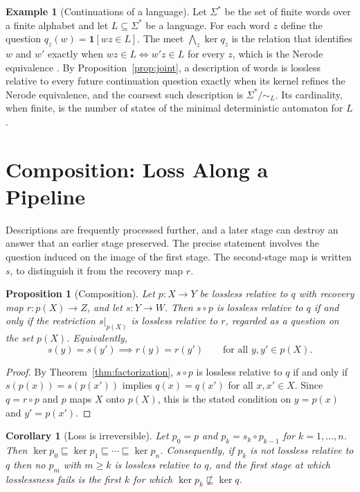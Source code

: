 \documentclass[11pt]{article}
\newtheorem{proposition}[theorem]{Proposition}
\newtheorem{corollary}[theorem]{Corollary}
\theoremstyle{definition}
\newtheorem{example}[theorem]{Example}
\theoremstyle{remark}
\newcommand{\refines}{\sqsubseteq}
\newcommand{\bigmeet}{\bigwedge}
\begin{document}
\begin{example}[Continuations of a language]\label{ex:nerode}
Let $\Sigma^*$ be the set of finite words over a finite alphabet and let $L\subseteq\Sigma^*$ be a language. For each word $z$ define the question $q_z(w)=\mathbf 1[wz\in L]$. The meet $\bigmeet_{z}\ker q_z$ is the relation that identifies $w$ and $w'$ exactly when $wz\in L\iff w'z\in L$ for every $z$, which is the Nerode equivalence \cite{nerode}. By Proposition~\ref{prop:joint}, a description of words is lossless relative to every future continuation question exactly when its kernel refines the Nerode equivalence, and the coarsest such description is $\Sigma^*/\!\sim_L$. Its cardinality, when finite, is the number of states of the minimal deterministic automaton for $L$.
\end{example}

\section{Composition: Loss Along a Pipeline}\label{sec:composition}

Descriptions are frequently processed further, and a later stage can destroy an answer that an earlier stage preserved. The precise statement involves the question induced on the image of the first stage. The second-stage map is written $s$, to distinguish it from the recovery map $r$.

\begin{proposition}[Composition]\label{prop:composition}
Let $p:X\to Y$ be lossless relative to $q$ with recovery map $r:p(X)\to Z$, and let $s:Y\to W$. Then $s\circ p$ is lossless relative to $q$ if and only if the restriction $s|_{p(X)}$ is lossless relative to $r$, regarded as a question on the set $p(X)$. Equivalently,
\[
s(y)=s(y')\implies r(y)=r(y')\qquad\text{for all }y,y'\in p(X).
\]
\end{proposition}

\begin{proof}
By Theorem~\ref{thm:factorization}, $s\circ p$ is lossless relative to $q$ if and only if $s(p(x))=s(p(x'))$ implies $q(x)=q(x')$ for all $x,x'\in X$. Since $q=r\circ p$ and $p$ maps $X$ onto $p(X)$, this is the stated condition on $y=p(x)$ and $y'=p(x')$.
\end{proof}

\begin{corollary}[Loss is irreversible]\label{cor:irreversible}
Let $p_0=p$ and $p_k=s_k\circ p_{k-1}$ for $k=1,\dots,n$. Then $\ker p_0\refines\ker p_1\refines\cdots\refines\ker p_n$. Consequently, if $p_k$ is not lossless relative to $q$ then no $p_m$ with $m\ge k$ is lossless relative to $q$, and the first stage at which losslessness fails is the first $k$ for which $\ker p_k\not\refines\ker q$.
\end{corollary}
\end{document}
